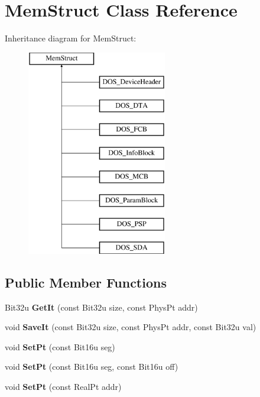 \hypertarget{classMemStruct}{\section{Mem\-Struct Class Reference}
\label{classMemStruct}
}
Inheritance diagram for Mem\-Struct\-:\begin{figure}[H]
\begin{center}
\leavevmode
\includegraphics[height=9.000000cm]{classMemStruct}
\end{center}
\end{figure}
\subsection*{Public Member Functions}
\begin{DoxyCompactItemize}
\item 
\hypertarget{classMemStruct_afa4f8877310aae5a757f4a30849a8f2d}{Bit32u {\bfseries Get\-It} (const Bit32u size, const Phys\-Pt addr)}\label{classMemStruct_afa4f8877310aae5a757f4a30849a8f2d}

\item 
\hypertarget{classMemStruct_a08aec3ad8437348b1f0c10c75c0e2e88}{void {\bfseries Save\-It} (const Bit32u size, const Phys\-Pt addr, const Bit32u val)}\label{classMemStruct_a08aec3ad8437348b1f0c10c75c0e2e88}

\item 
\hypertarget{classMemStruct_ae25851c2bd89342f26deba24e6e4fb5a}{void {\bfseries Set\-Pt} (const Bit16u seg)}\label{classMemStruct_ae25851c2bd89342f26deba24e6e4fb5a}

\item 
\hypertarget{classMemStruct_a67b18fbe231d442bd3b1ea904790ff14}{void {\bfseries Set\-Pt} (const Bit16u seg, const Bit16u off)}\label{classMemStruct_a67b18fbe231d442bd3b1ea904790ff14}

\item 
\hypertarget{classMemStruct_a56f200b767f2093bc73c55ca1e3a1e91}{void {\bfseries Set\-Pt} (const Real\-Pt addr)}\label{classMemStruct_a56f200b767f2093bc73c55ca1e3a1e91}

\end{DoxyCompactItemize}
